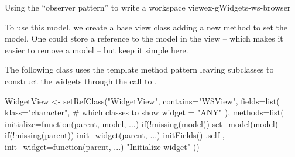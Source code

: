 \begin{example}{Using the ``observer pattern'' to write a workspace view}{ex-gWidgets-ws-browser}
\begin{Schunk}
\end{Schunk}
%



To use this model, we create a base view class adding a new method to
set the model. One could store a reference to the model in the view --
which makes it easier to remove a model -- but keep it simple here.
\begin{Schunk}
\end{Schunk}
%

The following  class uses the template method
pattern leaving subclasses to construct the widgets through the call
to . 

\begin{Schunk}
\begin{Sinput}
 WidgetView <- 
   setRefClass("WidgetView",
               contains="WSView",
               fields=list(
                 klass="character", # which classes to show
                 widget = "ANY"
                 ),
               methods=list(
                 initialize=function(parent, model, ...) {
                   if(!missing(model)) set_model(model)
                   if(!missing(parent)) init_widget(parent, ...)
                   initFields()
                   .self
                 },
                 init_widget=function(parent, ...) {
                   "Initialize widget"
                 }))
\end{Sinput}
\end{Schunk}
% 



\end{example}
